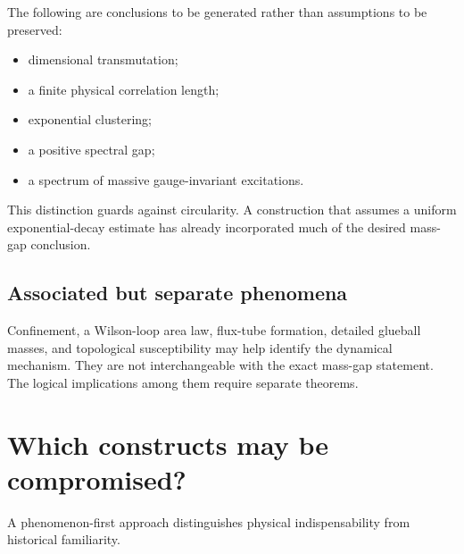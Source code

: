 \documentclass[11pt]{article}
\begin{document}
The following are conclusions to be generated rather than assumptions to be
preserved:
\begin{itemize}[leftmargin=2em]
  \item dimensional transmutation;
  \item a finite physical correlation length;
  \item exponential clustering;
  \item a positive spectral gap;
  \item a spectrum of massive gauge-invariant excitations.
\end{itemize}
This distinction guards against circularity.  A construction that assumes a
uniform exponential-decay estimate has already incorporated much of the desired
mass-gap conclusion.

\subsection{Associated but separate phenomena}

Confinement, a Wilson-loop area law, flux-tube formation, detailed glueball
masses, and topological susceptibility may help identify the dynamical
mechanism.  They are not interchangeable with the exact mass-gap statement.
The logical implications among them require separate theorems.

\section{Which constructs may be compromised?}

A phenomenon-first approach distinguishes physical indispensability from
historical familiarity.
\end{document}

